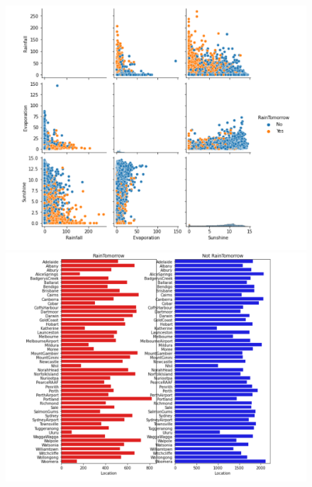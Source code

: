 \documentclass[12pt]{article}
\begin{document}
\begin{figure}[htbp]
  \centering
  \begin{minipage}[b]{0.49\textwidth}
    \includegraphics[width=\textwidth]{1.png}
  \end{minipage}
  \hfill
  \begin{minipage}[b]{0.49\textwidth}
    \includegraphics[width=\textwidth]{2.png}
  \end{minipage}
\end{figure}
\end{document}
